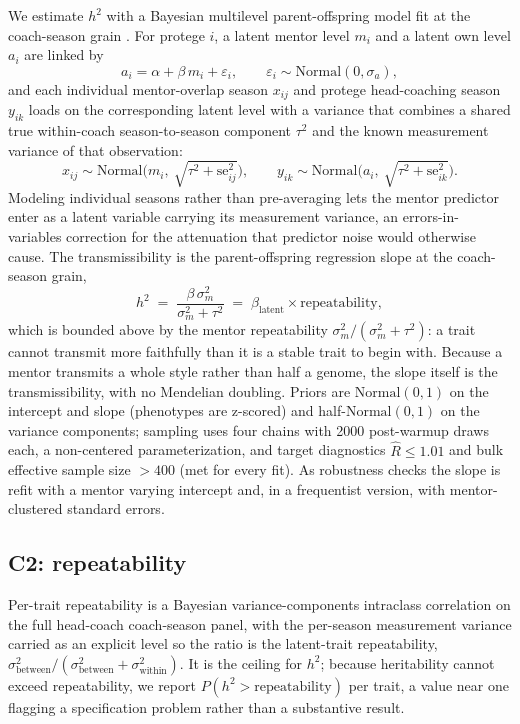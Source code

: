 \documentclass[11pt]{article}
\begin{document}
We estimate $h^{2}$ with a Bayesian multilevel parent-offspring model fit at the
coach-season grain \citep{wilson2010, nakagawa2010}. For protege $i$, a latent
mentor level $m_i$ and a latent own level $a_i$ are linked by
\begin{equation}
  a_i = \alpha + \beta\, m_i + \varepsilon_i, \qquad \varepsilon_i \sim \mathrm{Normal}(0,\sigma_a),
\end{equation}
and each individual mentor-overlap season $x_{ij}$ and protege head-coaching season
$y_{ik}$ loads on the corresponding latent level with a variance that combines a
shared true within-coach season-to-season component $\tau^2$ and the known
measurement variance of that observation:
\begin{equation}
  x_{ij}\sim\mathrm{Normal}\!\big(m_i,\ \sqrt{\tau^2+\mathrm{se}_{ij}^2}\big), \qquad
  y_{ik}\sim\mathrm{Normal}\!\big(a_i,\ \sqrt{\tau^2+\mathrm{se}_{ik}^2}\big).
\end{equation}
Modeling individual seasons rather than pre-averaging lets the mentor predictor
enter as a latent variable carrying its measurement variance, an errors-in-variables
correction for the attenuation that predictor noise would otherwise cause. The
transmissibility is the parent-offspring regression slope at the coach-season
grain,
\begin{equation}
  h^{2} \;=\; \frac{\beta\,\sigma_m^2}{\sigma_m^2+\tau^2}
        \;=\; \beta_{\text{latent}}\times \text{repeatability},
  \label{eq:h2}
\end{equation}
which is bounded above by the mentor repeatability $\sigma_m^2/(\sigma_m^2+\tau^2)$:
a trait cannot transmit more faithfully than it is a stable trait to begin with.
Because a mentor transmits a whole style rather than half a genome, the slope
itself is the transmissibility, with no Mendelian doubling. Priors are
$\mathrm{Normal}(0,1)$ on the intercept and slope (phenotypes are z-scored) and
half-$\mathrm{Normal}(0,1)$ on the variance components; sampling uses four chains
with 2000 post-warmup draws each, a non-centered parameterization, and target
diagnostics $\hat{R}\le 1.01$ and bulk effective sample size $>400$ (met for every
fit). As robustness checks the slope is refit with a mentor varying intercept and,
in a frequentist version, with mentor-clustered standard errors.

\subsection{C2: repeatability}
Per-trait repeatability is a Bayesian variance-components intraclass correlation on
the full head-coach coach-season panel, with the per-season measurement variance
carried as an explicit level so the ratio is the latent-trait repeatability,
$\sigma_{\text{between}}^2/(\sigma_{\text{between}}^2+\sigma_{\text{within}}^2)$. It
is the ceiling for $h^{2}$; because heritability cannot exceed repeatability, we
report $P(h^{2}>\text{repeatability})$ per trait, a value near one flagging a
specification problem rather than a substantive result.
\end{document}
